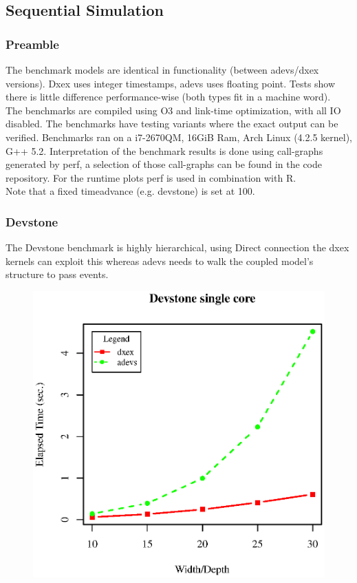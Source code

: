 \subsection{Sequential Simulation}
\subsubsection{Preamble}
The benchmark models are identical in functionality (between adevs/dxex versions). Dxex uses integer timestamps, adevs uses floating point. Tests show there is little difference performance-wise (both types fit in a machine word).\\ The benchmarks are compiled using O3 and link-time optimization, with all IO disabled. The benchmarks have testing variants where the exact output can be verified.
Benchmarks ran on a i7-2670QM, 16GiB Ram, Arch Linux (4.2.5 kernel), G++ 5.2. Interpretation of the benchmark results is done using call-graphs generated by perf, a selection of those call-graphs can be found in the code repository. For the runtime plots perf is used in combination with R.\\
Note that a fixed timeadvance (e.g. devstone) is set at 100.
\subsubsection{Devstone}
The Devstone \cite{DEVStone} benchmark is highly hierarchical, using Direct connection the dxex kernels can exploit this whereas adevs needs to walk the coupled model's structure to pass events.\\
\begin{figure}[h]
	\includegraphics[width=.5\textwidth]{fig/fig1.eps}
	\label{fig1.eps}
\end{figure}

